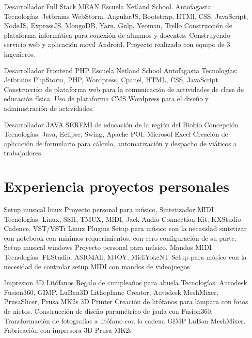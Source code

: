 \documentclass[draft,color,12pt,letterpaper,sans]{moderncv}
\begin{document}
{Desarrollador Full Stack MEAN}
{Escuela Netland School.}
{Antofagasta}
{\newline Tecnologías: Jetbrains WebStorm, AngularJS, Bootstrap, HTMl, CSS, JavaScript, NodeJS, ExpressJS, MongoDB, Yarn, Gulp, Yeoman, Trello}
{Construcción de plataforma informática para conexión de alumnos y docentes. Construyendo servicio web y aplicación movil Android. Proyecto realizado con equipo de 3 ingenieros. \newline}

{Desarrollador Frontend PHP}
{Escuela Netland School}
{Antofagasta}
{\newline Tecnologías: Jetbrains PhpStorm, PHP, Wordpress, Cpanel, HTML, CSS, JavaScript}
{Construcción de plataforma web para la comunicación de actividades de clase de educación física. Uso de plataforma CMS Wordpress para el dise\~no y administración de actividades.\newline}

{Desarrollador JAVA}
{SEREMI de educación de la región del Biobío}
{Concepción}
{\newline Tecnologías: Java, Eclipse, Swing, Apache POI, Microsof Excel}
{Creación de aplicación de formulario para cálculo, automatización y despacho de viáticos a trabajadores.\newline}


\section{Experiencia proyectos personales}

\cventry {}
{Setup musical linux}
{Proyecto personal para músico, Sintetizador MIDI}
{}
{\newline Tecnologías: Linux, SSH, TMUX, MIDI, Jack Audio Connection Kit, KXStudio Cadence, VST/VSTi Linux Plugins}
{Setup para músico con la necesidad sintetizar con notebook con mínimos requerimientos, con cero configuración de su parte.\newline}
\cventry {}
{Setup musical windows}
{Proyecto personal para músico, Mandos MIDI}
{}
{\newline Tecnologías: FLStudio, ASIO4All, MJOY, MidiYokeNT}
{Setup para músico con la necesidad de controlar setup MIDI con mandos de videojuegos\newline}


\cventry {}
{Impresion 3D Litófanos}
{Regalo de cumpleaños para abuela}
{}
{\newline Tecnologías: Autodesk Fusion360, GIMP, LuBan3D Lithophane Creator, Autodesk MeshMixer, PrusaSlicer, Prusa MK2s 3D Printer}
{Creación de litófanos para lámpara con fotos de nietos. Construcción de diseño paramétrico de jaula con Fusion360.
Transformación de fotografías a litófano con la cadena GIMP \faArrowRight LuBan \faArrowRight MeshMixer. Fabricación con impresora 3D Prusa MK2s \newline}
\end{document}
